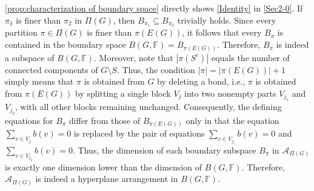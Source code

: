 \documentclass[12pt]{article}%
\renewcommand*{\bm}[1]{#1}%
\numberwithin{equation}{section}
\begin{document}
\autoref{prop:characterization of boundary space} directly shows \eqref{Identity} in \autoref{Sec2-0}. If $\pi_1$ is finer than $\pi_2$ in $\Pi(G)$, then $B_{\pi_1}\subseteq B_{\pi_2}$ trivially holds. Since every partition $\pi\in\Pi(G)$ is finer than $\pi(E(G))$, it follows that every $B_\pi$ is contained in the boundary space $B(G,\mathbb{F})=B_{\pi(E(G))}$. Therefore, $B_\pi$ is indeed a subspace of $B(G,\mathbb{F})$. Moreover, note that $|\pi(S^c)|$ equals the number of connected components of $G\setminus S$. Thus, the condition $|\pi|=|\pi(E(G))|+1$ simply means that $\pi$ is obtained from $G$ by deleting a bond, i.e., $\pi$ is obtained from $\pi(E(G))$ by splitting a single block $V_j$ into two nonempty parts $V_{j_1}$ and $V_{j_2}$, with all other blocks remaining unchanged. Consequently, the defining equations for $B_\pi$ differ from those of $B_{\pi(E(G))}$ only in that the equation $\sum_{v\in V_j}\bm b(v)=0$ is replaced by the pair of equations $\sum_{v\in V_{j_1}}\bm b(v)=0$ and $\sum_{v\in V_{j_2}}\bm b(v)=0$. Thus, the dimension of each boundary subspace $B_\pi$ in $\mathcal{A}_{\Pi(G)}$ is exactly one dimension lower than the dimension of $B(G,\mathbb{F})$. Therefore, $\mathcal{A}_{\Pi(G)}$ is indeed a hyperplane arrangement in $B(G,\mathbb{F})$.
\end{document}
